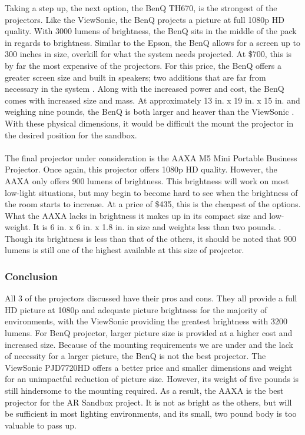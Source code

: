 Taking a step up, the next option, the BenQ TH670, is the strongest of the projectors.
Like the ViewSonic, the BenQ projects a picture at full 1080p HD quality.
With 3000 lumens of brightness, the BenQ sits in the middle of the pack in regards to brightness.
Similar to the Epson, the BenQ allows for a screen up to 300 inches in size, overkill for what the system needs projected.
At \$700, this is by far the most expensive of the projectors.
For this price, the BenQ offers a greater screen size and built in speakers; two additions that are far from necessary in the system .
Along with the increased power and cost, the BenQ comes with increased size and mass.
At approximately 13 in. x 19 in. x 15 in. and weighing nine pounds, the BenQ is both larger and heaver than the ViewSonic .  
With these physical dimensions, it would be difficult the mount the projector in the desired position for the sandbox. 
\\\\
The final projector under consideration is the AAXA M5 Mini Portable Business Projector.
Once again, this projector offers 1080p HD quality.
However, the AAXA only offers 900 lumens of brightness.
This brightness will work on most low-light situations, but may begin to become hard to see when the brightness of the room starts to increase.
At a price of \$435, this is the cheapest of the options.
What the AAXA lacks in brightness it makes up in its compact size and low-weight.
It is 6 in. x 6 in. x 1.8 in. in size and weights less than two pounds. .
Though its brightness is less than that of the others, it should be noted that 900 lumens is still one of the highest available at this size of projector.
\subsubsection{Conclusion}

All 3 of the projectors discussed have their pros and cons.
They all provide a full HD picture at 1080p and adequate picture brightness for the majority of environments, with the ViewSonic providing the greatest brightness with 3200 lumens.
For BenQ projector, larger picture size is provided at a higher cost and increased size.
Because of the mounting requirements we are under and the lack of necessity for a larger picture, the BenQ is not the best projector.
The ViewSonic PJD7720HD offers a better price and smaller dimensions and weight for an unimpactful reduction of picture size.  However, its weight of five pounds is still hindersome to the mounting required.  As a result, the AAXA is the best projector for the AR Sandbox project.  It is not as bright as the others, but will be sufficient in most lighting environments, and its small, two pound body is too valuable to pass up.


